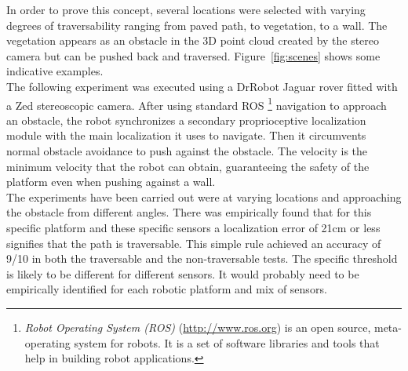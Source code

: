 \documentclass[12pt,a4paper,table,dvipsnames,tikz]{report}
\newcommand{\term}{\textit}
\newcommand{\acronym}{\MakeUppercase}
\newcommand{\bl}[1]{{\hypersetup{linkcolor=blue}#1}}
\begin{document}
	In order to prove this concept, several locations were selected with varying degrees 
	of traversability ranging from paved path, to vegetation, to a wall. The vegetation 
	appears as an obstacle in the \acronym{3d} point cloud created by the stereo camera 
	but can be pushed back and traversed. Figure~\bl{\ref{fig:scenes}} shows some 
	indicative examples. 
	\\
	
	The following experiment was executed using a DrRobot Jaguar rover fitted with a 
	Zed stereoscopic camera. After using standard \acronym{ros} 
	\footnote{ \term{Robot Operating System (\acronym{ros})} (\url{http://www.ros.org}) 
		is an open source, meta-operating system for robots. It is a set of software 
		libraries and tools that help in building robot applications.}
	navigation to approach an obstacle, the robot synchronizes 
	a secondary proprioceptive localization module with the main localization it uses
	to navigate. Then it circumvents normal obstacle avoidance to push against the 
	obstacle. The velocity is the minimum velocity that the robot can obtain, 
	guaranteeing the safety of the platform even when pushing against a wall.
	\\
	
	The experiments have been carried out were at varying locations and approaching the 
	obstacle from different angles. There was empirically found that for this specific 
	platform and these specific sensors a localization error of 21cm or less signifies 
	that the path is traversable. This simple rule achieved an accuracy of 9/10 in both 
	the traversable and the non-traversable tests. The specific threshold is likely 
	to be different for different sensors. It would probably need to be empirically 
	identified for each robotic platform and mix of sensors.
	\\
	
	
	\renewcommand*{\bibfont}{\small}
	\renewcommand{\bibname}{REFERENCES}
	
	
\end{document}
